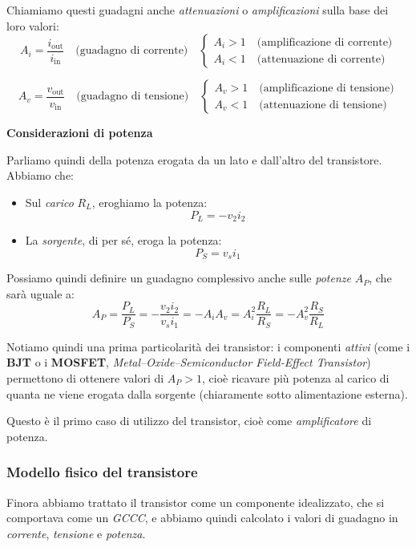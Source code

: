 \documentclass[a4paper,11pt]{article}
\begin{document}
Chiamiamo questi guadagni anche \textit{attenuazioni} o \textit{amplificazioni} sulla base dei loro valori:
$$
A_i = \frac{i_\mathrm{out}}{i_\mathrm{in}} \quad \text{(guadagno di corrente)} \quad
\begin{cases}
	A_i > 1 \quad \text{(amplificazione di corrente)} \\
	A_i < 1 \quad \text{(attenuazione di corrente)}
\end{cases}
$$

$$
A_v = \frac{v_\mathrm{out}}{v_\mathrm{in}} \quad \text{(guadagno di tensione)} \quad
\begin{cases}
	A_v > 1 \quad \text{(amplificazione di tensione)} \\
	A_v < 1 \quad \text{(attenuazione di tensione)}
\end{cases}
$$

\par\smallskip

\noindent
\textbf{\textsf{Considerazioni di potenza}}

\noindent
Parliamo quindi della potenza erogata da un lato e dall'altro del transistore. Abbiamo che:
\begin{itemize}
\item Sul \textit{carico} $R_L$, eroghiamo la potenza:
$$
P_L = -v_2 i_2
$$
\item La \textit{sorgente}, di per sé, eroga la potenza:
$$
P_S = v_s i_1
$$
\end{itemize}

Possiamo quindi definire un guadagno complessivo anche sulle \textit{potenze} $A_P$, che sarà uguale a:
$$
A_P = \frac{P_L}{P_S} = -\frac{v_2 i_2}{v_s i_1} = -A_i A_v = A_i^2 \frac{R_L}{R_S} = - A_v^2 \frac{R_S}{R_L}
$$

Notiamo quindi una prima particolarità dei transistor: i componenti \textit{attivi} (come i \textbf{BJT} o i \textbf{MOSFET}, \textit{Metal–Oxide–Semiconductor Field-Effect Transistor}) permettono di ottenere valori di $A_P > 1$, cioè ricavare più potenza al carico di quanta ne viene erogata dalla sorgente (chiaramente sotto alimentazione esterna).

Questo è il primo caso di utilizzo del transistor, cioè come \textit{amplificatore} di potenza.

\subsubsection{Modello fisico del transistore}
Finora abbiamo trattato il transistor come un componente idealizzato, che si comportava come un \textit{GCCC}, e abbiamo quindi calcolato i valori di guadagno in \textit{corrente}, \textit{tensione} e \textit{potenza}.
\end{document}
